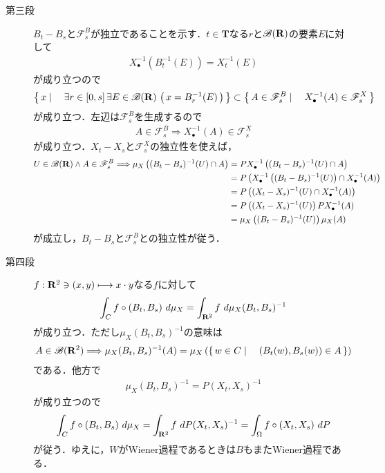 \begin{sketch}
\begin{description}
			\item[第三段]
				$B_t - B_s$と$\mathscr{F}_s^B$が独立であることを示す．$t \in \mathbf{T}$なる$r$と$\mathscr{B}(\mathbf{R})$の要素$E$に対して
				\begin{align}
					X_\bullet^{-1}(B_t^{-1}(E)) = X_t^{-1}(E)
				\end{align}
				が成り立つので
				\begin{align}
					\left\{\, x \mid \quad \exists r \in [0,s]\, \exists E \in \mathscr{B}(\mathbf{R})\, \left(\, x=B_r^{-1}(E)\, \right)\, \right\}
					\subset \left\{\, A \in \mathscr{F}_s^B \mid \quad X_\bullet^{-1}(A) \in \mathscr{F}^X_s\, \right\}
				\end{align}
				が成り立つ．左辺は$\mathscr{F}_s^B$を生成するので
				\begin{align}
					A \in \mathscr{F}_s^B \Longrightarrow X_\bullet^{-1}(A) \in \mathscr{F}^X_s
				\end{align}
				が成り立つ．$X_t-X_s$と$\mathscr{F}^X_s$の独立性を使えば，
				\begin{align}
					U \in \mathscr{B}(\mathbf{R}) \wedge A \in \mathscr{F}_s^B \Longrightarrow
					\mu_X\left((B_t-B_s)^{-1}(U) \cap A\right)
					&= P X_\bullet^{-1}\left((B_t-B_s)^{-1}(U) \cap A\right) \\
					&= P \left( X_\bullet^{-1}\left((B_t-B_s)^{-1}(U)\right) \cap X_\bullet^{-1}(A)\right) \\
					&= P \left( (X_t-X_s)^{-1}(U) \cap X_\bullet^{-1}(A)\right) \\
					&= P \left( (X_t-X_s)^{-1}(U) \right) P X_\bullet^{-1}(A) \\
					&= \mu_X\left((B_t-B_s)^{-1}(U) \right) \mu_X(A)
				\end{align}
				が成立し，$B_t-B_s$と$\mathscr{F}^B_s$との独立性が従う．
				
			\item[第四段]
				$f:\mathbf{R}^2 \ni (x,y) \longmapsto x \cdot y$なる$f$に対して
				\begin{align}
					\int_C f \circ (B_t,B_s)\ d\mu_X = 
					\int_{\mathbf{R}^2} f\ d\mu_X(B_t,B_s)^{-1}
				\end{align}
				が成り立つ．ただし$\mu_X(B_t,B_s)^{-1}$の意味は
				\begin{align}
					A \in \mathscr{B}(\mathbf{R}^2) \Longrightarrow
					\mu_X(B_t,B_s)^{-1}(A) = \mu_X\left(\left\{\, w \in C \mid \quad (B_t(w),B_s(w)) \in A\, \right\} \right)
				\end{align}
				である．他方で
				\begin{align}
					\mu_X(B_t,B_s)^{-1} = P (X_t,X_s)^{-1}
				\end{align}
				が成り立つので
				\begin{align}
					\int_C f \circ (B_t,B_s)\ d\mu_X = 
					\int_{\mathbf{R}^2} f\ dP(X_t,X_s)^{-1}
					= \int_\Omega f \circ (X_t,X_s)\ dP
				\end{align}
				が従う．ゆえに，$W$がWiener過程であるときは$B$もまたWiener過程である．
				\QED
		\end{description}
	\end{sketch}
	
